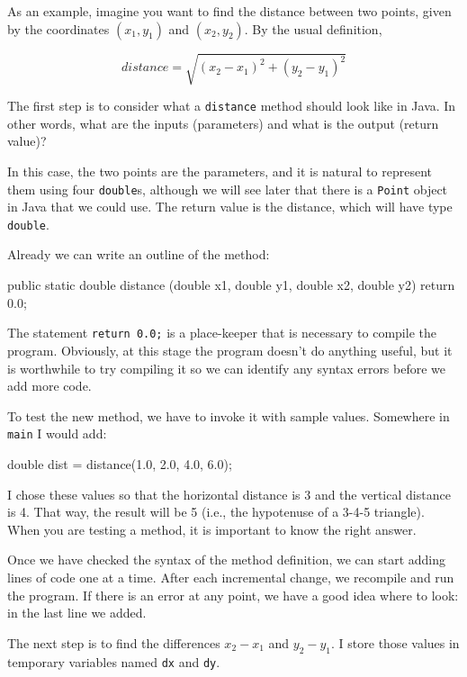 \documentclass[12pt]{book}
\begin{document}
As an example, imagine you want to find the distance between two points, given by the coordinates $(x_1, y_1)$ and $(x_2, y_2)$.
By the usual definition,

\begin{equation*}
distance = \sqrt{(x_2 - x_1)^2 +(y_2 - y_1)^2}
\end{equation*}

The first step is to consider what a {\tt distance} method should look like in Java.
In other words, what are the inputs (parameters) and what is the output (return value)?

In this case, the two points are the parameters, and it is natural to represent them using four {\tt double}s, although we will see later that there is a {\tt Point} object in Java that we could use.
The return value is the distance, which will have type {\tt double}.

Already we can write an outline of the method:

\begin{code}
    public static double distance
            (double x1, double y1, double x2, double y2) {
        return 0.0;
    }
\end{code}

The statement {\tt return 0.0;} is a place-keeper that is necessary to compile the program.
Obviously, at this stage the program doesn't do anything useful, but it is worthwhile to try compiling it so we can identify any syntax errors before we add more code.

To test the new method, we have to invoke it with sample values.
Somewhere in {\tt main} I would add:

\begin{code}
    double dist = distance(1.0, 2.0, 4.0, 6.0);
\end{code}

I chose these values so that the horizontal distance is 3 and the vertical distance is 4.
That way, the result will be 5 (i.e., the hypotenuse of a 3-4-5 triangle).
When you are testing a method, it is important to know the right answer.

Once we have checked the syntax of the method definition, we can start adding lines of code one at a time.
After each incremental change, we recompile and run the program.
If there is an error at any point, we have a good idea where to look: in the last line we added.

The next step is to find the differences $x_2 - x_1$ and $y_2 - y_1$.
I store those values in temporary variables named {\tt dx} and {\tt dy}.
\end{document}
